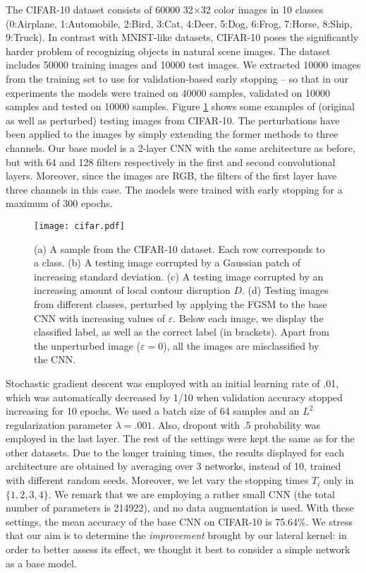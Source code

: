 \documentclass[11pt,oneside,reqno]{amsart}
\begin{document}
 The CIFAR-10 dataset consists of 60000 32$\times$32 color images in 10 classes (0:Airplane, 1:Automobile, 2:Bird, 3:Cat, 4:Deer, 5:Dog, 6:Frog, 7:Horse, 8:Ship, 9:Truck). In contrast with MNIST-like datasets, CIFAR-10 poses the significantly harder problem of recognizing objects in natural scene images. The dataset includes 50000 training images and 10000 test images. We extracted 10000 images from the training set to use for validation-based early stopping -- so that in our experiments the models were trained on 40000 samples, validated on 10000 samples and tested on 10000 samples. Figure \ref{cifar} shows some examples of (original as well as perturbed) testing images from CIFAR-10. The perturbations have been applied to the images by simply extending the former methods to three channels. Our base model is a 2-layer CNN with the same architecture as before, but with 64 and 128 filters respectively in the first and second convolutional layers. Moreover, since the images are RGB, the filters of the first layer have three channels in this case. The models were trained with early stopping for a maximum of 300 epochs.
 \begin{figure}[ht!]
 \centering
 \texttt{[image: cifar.pdf]}
 \caption{(a) A sample from the CIFAR-10 dataset. Each row corresponds to a class. (b) A testing image corrupted by a Gaussian patch of increasing standard deviation. (c) A testing image corrupted by an increasing amount of local contour disruption $D$. (d) Testing images from different classes, perturbed by applying the FGSM to the base CNN with increasing values of $\varepsilon$. Below each image, we display the classified label, as well as the correct label (in brackets). Apart from the unperturbed image ($\varepsilon=0$), all the images are misclassified by the CNN.}\label{cifar}
 \end{figure}
 Stochastic gradient descent was employed with an initial learning rate of .01, which was automatically decreased by 1/10 when validation accuracy stopped increasing for 10 epochs. We used a batch size of 64 samples and an $L^2$ regularization parameter $\lambda=.001$. Also, dropout with .5 probability was employed in the last layer. The rest of the settings were kept the same as for the other datasets. Due to the longer training times, the results displayed for each architecture are obtained by averaging over 3 networks, instead of 10, trained with different random seeds. Moreover, we let vary the stopping times $T_i$ only in $\{1,2,3,4\}$. We remark that we are employing a rather small CNN (the total number of parameters is 214922), and no data augmentation is used. With these settings, the mean accuracy of the base CNN on CIFAR-10 is 75.64\%. We stress that our aim is to determine the \emph{improvement} brought by our lateral kernel: in order to better assess its effect, we thought it best to consider a simple network as a base model.
 
\end{document}
